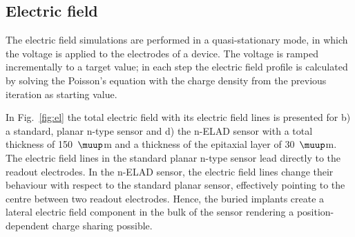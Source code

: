 \documentclass[a4paper,11pt]{article}
\begin{document}
\subsection{Electric field}
\label{sec:ef}
The electric field simulations are performed in a quasi-stationary mode, in which the voltage is applied to the electrodes of a device.
The voltage is ramped incrementally to a target value; in each step the electric field profile is calculated
 by solving the Poisson's equation with the charge density from the previous iteration as starting value.

In Fig.~\ref{fig:el} the total electric field with its electric field lines is presented for b) a standard, planar n-type sensor and d) the n-ELAD sensor
 with a total thickness of 150~$\muup$m and a thickness of the epitaxial layer of 30~$\muup$m.
The electric field lines in the standard planar n-type sensor lead directly to the readout electrodes. 
In the n-ELAD sensor, the electric field lines change their behaviour with respect to the standard planar sensor, effectively pointing to the centre between two readout electrodes. 
Hence, the buried implants create a lateral electric field component in the bulk of the sensor rendering a position-dependent charge sharing possible.
\end{document}
